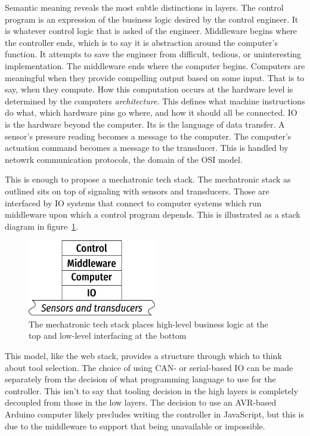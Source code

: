 \documentclass[english,12pt,a4paper,pdftex,eng,utf8]{aaltothesis}
\begin{document}
Semantic meaning reveals the most subtle distinctions in layers.  The control program is an expression of the business logic desired by the control engineer.  It is whatever control logic that is asked of the engineer.  Middleware begins where the controller ends, which is to say it is abstraction around the computer's function.  It attempts to save the engineer from difficult, tedious, or uninteresting implementation.  The middleware ends where the computer begins.  Computers are meaningful when they provide compelling output based on some input.  That is to say, when they compute.  How this computation occurs at the hardware level is determined by the computers {\it architecture}.  This defines what machine instructions do what, which hardware pins go where, and how it should all be connected.  IO is the hardware beyond the computer.  Its is the language of data transfer.  A sensor's pressure reading becomes a message to the computer.  The computer's actuation command becomes a message to the transducer.  This is handled by netowrk communication protocols, the domain of the OSI model.

This is enough to propose a mechatronic tech stack.  The mechatronic stack as outlined sits on top of signaling with sensors and transducers.  Those are interfaced by IO systems that connect to computer systems which run middleware upon which a control program depends.  This is illustrated as a stack diagram in figure~\ref{fig:mechatronic_tech_stack}.

\begin{figure}[h]
  \centering
  \includegraphics[width=0.5\textwidth]{assets/mechatronic_tech_stack}
  \caption{The mechatronic tech stack places high-level business logic at the top and low-level interfacing at the bottom}\label{fig:mechatronic_tech_stack}
\end{figure}

This model, like the web stack, provides a structure through which to think about tool selection.  The choice of using CAN- or serial-based IO can be made separately from the decision of what programming language to use for the controller.  This isn't to say that tooling decision in the high layers is completely decoupled from those in the low layers.  The decision to use an AVR-based Arduino computer likely precludes writing the controller in JavaScript, but this is due to the middleware to support that being unavailable or impossible.
\end{document}
